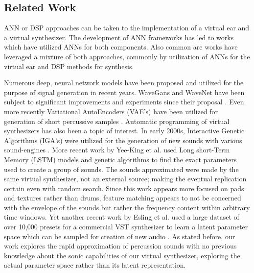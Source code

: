 \documentclass[\main/thesis.tex]{subfiles}
\begin{document}
\subsection{Related Work}
ANN or DSP approaches can be taken to the implementation of a virtual ear and a virtual synthesizer. The development of ANN frameworks has led to works which have utilized ANNs for both components. Also common are works have leveraged a mixture of both approaches, commonly by utilization of ANNs for the virtual ear and DSP methods for synthesis.

\begin{center}
\begin{table}[h*]
\caption{for reference, will delete} %
\end{table}
\end{center}
Numerous deep, neural network models have been proposed and utilized for the purpose of signal generation in recent years. WaveGans and WaveNet have been subject to significant improvements and experiments since their proposal \cite{nsynth2017,yamamoto2020parallel,oord2017parallel}. Even more recently Variational AutoEncoders (VAE's) have been utilized for generation of short percussive samples \cite{aouameur2019neural,ramires2019timbfeat}.
Automatic programming of virtual synthesizers has also been a topic of interest. In early 2000s, Interactive Genetic Algorithms (IGA's) were utilized for the generation of new sounds with various sound-engines \cite{johnson1999exploring,dahlstedt2001creating}. More recent work by Yee-King et al. \cite{yee2018automatic} used Long short-Term Memory (LSTM) models and genetic algorithms to find the exact parameters used to create a group of sounds. The sounds approximated were made by the same virtual synthesizer, not an external source; making the eventual replication certain even with random search. Since this work appears more focused on pads and textures rather than drums, feature matching appears to not be concerned with the envelope of the sounds but rather the frequency content within arbitrary time windows. Yet another recent work by Esling et al. used a large dataset of over 10,000 presets for a commercial VST synthesizer to learn a latent parameter space which can be sampled for creation of new audio \cite{esling2019universal}. As stated before, our work explores the rapid approximation of percussion sounds with no previous knowledge about the sonic capabilities of our virtual synthesizer, exploring the actual parameter space rather than its latent representation.

 
\end{document}
